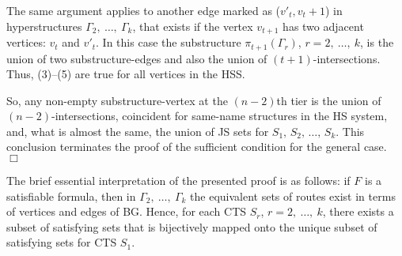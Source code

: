 \documentclass[12pt, a4paper]{article}
\begin{document}
The same argument applies to another edge marked as ($v'_t, v_t+1$) in hyperstructures $\Gamma_2, \ \dots,\ \Gamma_k$, that exists if the vertex $v_{t+1}$  has two adjacent vertices: $v_t$  and  $v'_t$. In this case the substructure $\pi_{t+1}(\Gamma_r)$,  $r=2, \ \dots,\ k$, is the union of two substructure-edges and also the union of  $(t+1)$-intersections. Thus, (3)--(5) are true for all vertices in the HSS.

So, any non-empty substructure-vertex at the $(n-2)$th tier is the union of $(n-2)$-intersections, coincident for same-name structures in the HS system, and, what is almost the same, the union of JS sets for $S_1,\, S_2, \,\ldots,\, S_k$. This conclusion terminates the proof of the sufficient condition for the general case. $\Box$

The brief essential interpretation of the presented proof is as follows: if  $F$  is a satisfiable formula, then in $\Gamma_2, \ \dots,\ \Gamma_k$ the equivalent sets of routes exist in terms of vertices and edges of BG. Hence, for each CTS  $S_r$,  $r=2, \ \dots,\ k$, there exists a subset of satisfying sets that is bijectively mapped onto the unique subset of satisfying sets for CTS  $S_1$.
\end{document}
